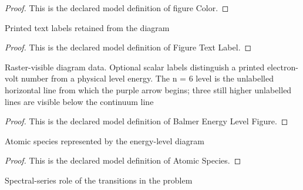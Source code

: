 \begin{proof}
  This is the declared model definition of figure Color.
\end{proof}
\begin{definition}
  \label{def:physics:phyx-mini-0536:phyxminiproblems-problemphyxmini0536-figuretextlabel}
  Printed text labels retained from the diagram
\end{definition}
\begin{proof}
  This is the declared model definition of Figure Text Label.
\end{proof}
\begin{definition}
  \label{def:physics:phyx-mini-0536:phyxminiproblems-problemphyxmini0536-balmerenergylevelfigure}
  Raster-visible diagram data. Optional scalar labels distinguish a printed electron-volt number from a physical level energy. The n = 6 level is the unlabelled horizontal line from which the purple arrow begins; three still higher unlabelled lines are visible below the continuum line
\end{definition}
\begin{proof}
  This is the declared model definition of Balmer Energy Level Figure.
\end{proof}
\begin{definition}
  \label{def:physics:phyx-mini-0536:phyxminiproblems-problemphyxmini0536-atomicspecies}
  Atomic species represented by the energy-level diagram
\end{definition}
\begin{proof}
  This is the declared model definition of Atomic Species.
\end{proof}
\begin{definition}
  \label{def:physics:phyx-mini-0536:phyxminiproblems-problemphyxmini0536-spectralseries}
  Spectral-series role of the transitions in the problem
\end{definition}
